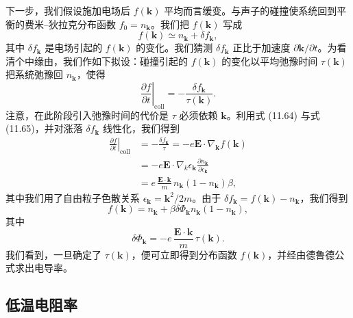 下一步，我们假设施加电场后 $f(\mathbf{k})$ 平均而言缓变。与声子的碰撞使系统回到平衡的费米–狄拉克分布函数 $f_0=n_{\mathbf{k}}$。我们把 $f(\mathbf{k})$ 写成
\begin{equation*}
f(\mathbf{k})\simeq n_{\mathbf{k}}+\delta f_{\mathbf{k}},\tag{11.71}
\end{equation*}
其中 $\delta f_{\mathbf{k}}$ 是电场引起的 $f(\mathbf{k})$ 的变化。我们猜测 $\delta f_{\mathbf{k}}$ 正比于加速度 $\partial\mathbf{k}/\partial t$。为看清个中缘由，我们作如下拟设：碰撞引起的 $f(\mathbf{k})$ 的变化以平均弛豫时间 $\tau(\mathbf{k})$ 把系统弛豫回 $n_{\mathbf{k}}$，使得
\begin{equation*}
\left.\frac{\partial f}{\partial t}\right|_{\mathrm{coll}}=-\frac{\delta f_{\mathbf{k}}}{\tau(\mathbf{k})}.\tag{11.72}
\end{equation*}
注意，在此阶段引入弛豫时间的代价是 $\tau$ 必须依赖 $\mathbf{k}$。利用式 (11.64) 与式 (11.65)，并对涨落 $\delta f_{\mathbf{k}}$ 线性化，我们得到
\begin{align*}
\left.\frac{\partial f}{\partial t}\right|_{\mathrm{coll}}&=-\frac{\delta f_{\mathbf{k}}}{\tau}=-e\mathbf{E}\cdot\nabla_{\mathbf{k}}f(\mathbf{k})\\
&=-e\mathbf{E}\cdot\nabla_{k}\epsilon_{\mathbf{k}}\frac{\partial n_{\mathbf{k}}}{\partial\epsilon_{\mathbf{k}}}\\
&=e\,\frac{\mathbf{E}\cdot\mathbf{k}}{m}\,n_{\mathbf{k}}(1-n_{\mathbf{k}})\beta,\tag{11.73}
\end{align*}
其中我们用了自由粒子色散关系 $\epsilon_{\mathbf{k}}=\mathbf{k}^2/2m$。由于 $\delta f_{\mathbf{k}}=f(\mathbf{k})-n_{\mathbf{k}}$，我们得到
\begin{equation*}
f(\mathbf{k})=n_{\mathbf{k}}+\beta\delta\Phi_{\mathbf{k}}n_{\mathbf{k}}(1-n_{\mathbf{k}}),\tag{11.74}
\end{equation*}
其中
\begin{equation*}
\delta\Phi_{\mathbf{k}}=-e\,\frac{\mathbf{E}\cdot\mathbf{k}}{m}\,\tau(\mathbf{k}).\tag{11.75}
\end{equation*}
我们看到，一旦确定了 $\tau(\mathbf{k})$，便可立即得到分布函数 $f(\mathbf{k})$，并经由德鲁德公式求出电导率。

\subsection{低温电阻率}


